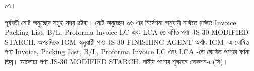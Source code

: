 \documentclass[12pt]{article}
\begin{document}
\noindent
\begin{minipage}[t]{0.05\linewidth}
০৭।
\end{minipage}
\begin{minipage}[t]{0.95\linewidth}
পূর্ববর্তী নোট অনুচ্ছেদ সমূহ সদয় দ্রষ্টব্য।
নোট অনুচ্ছেদ ০৬ এর নির্দেশনা অনুযায়ী নথিতে
রক্ষিত
Invoice, Packing List, B/L, Proforma Invoice LC
এবং
LCA
তে বর্ণিত পণ্য
JS-30
MODIFIED STARCH.
অপরদিকে
IGM অনুযায়ী পণ্য
JS-30
FINISHING AGENT
অর্থাৎ
IGM
-এ ঘোষিত পণ্য
Invoice, Packing List, B/L, Proforma Invoice LC
এবং
LCA
-তে ঘোষিত পণ্যের
বর্ণনা ভিন্ন।
আলোচ্য পণ্য
JS-30
MODIFIED STARCH.
নামীয় পণ্যের শুল্কায়ন
সেকশন-৮(সি)।
\end{minipage}
\end{document}
